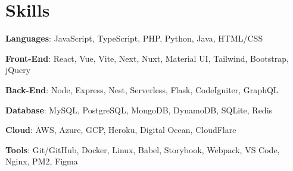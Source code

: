 \documentclass[letterpaper,12pt]{article}
\begin{document}
\section{Skills}
 \begin{itemize}[leftmargin=0.15in, label={}]
    \small{\item{
    
     \textbf{Languages}{: JavaScript, TypeScript, PHP, Python, Java, HTML/CSS}
     
     \textbf{Front-End}{: React, Vue, Vite, Next, Nuxt, Material UI, Tailwind, Bootstrap, jQuery}

     \textbf{Back-End}{: Node, Express, Nest, Serverless, Flask, CodeIgniter, GraphQL}

     \textbf{Database}{: MySQL, PostgreSQL, MongoDB, DynamoDB, SQLite, Redis}

     \textbf{Cloud}{: AWS, Azure, GCP, Heroku, Digital Ocean, CloudFlare}
     
     \textbf{Tools}{: Git/GitHub, Docker, Linux, Babel, Storybook, Webpack, VS Code, Nginx, PM2, Figma}
     
    }}
 \end{itemize}
\end{document}
